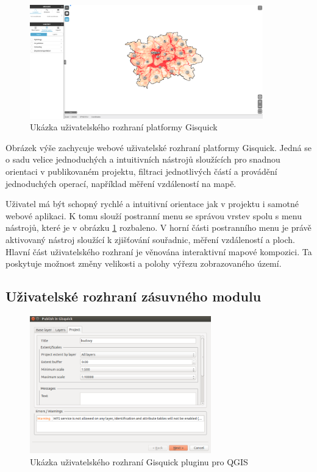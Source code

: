 \begin{figure}[h!]
\centering
\includegraphics[width=0.9\textwidth]{../img/gisquick_ui.png}
\caption{Ukázka uživatelského rozhraní platformy
Gisquick\cite{gisquick-prague}}
\label{fig:gisquick-prague}
\end{figure}

Obrázek výše zachycuje webové uživatelské rozhraní platformy
Gisquick. Jedná se o sadu velice jednoduchých a intuitivních nástrojů
sloužících pro snadnou orientaci v publikovaném projektu, filtraci
jednotlivých částí a provádění jednoduchých operací, například
měření vzdáleností na mapě.

Uživatel má být schopný rychlé a intuitivní orientace jak v projektu i 
samotné webové aplikaci. K tomu slouží postranní menu se správou
vrstev spolu s menu nástrojů, které je v obrázku \ref{fig:gisquick-prague}
rozbaleno. V horní části postranního menu je právě aktivovaný
nástroj sloužící k zjišťování souřadnic, měření vzdáleností
a ploch. Hlavní část uživatelského rozhraní je věnována interaktivní mapové kompozici. Ta
poskytuje možnost změny velikosti a polohy výřezu zobrazovaného území.

\newpage
\subsection{Uživatelské rozhraní zásuvného modulu}

\begin{figure}[h!]
	\centering
	\includegraphics[width=0.7\textwidth]{../img/gisquick_plugin.png}
	\caption{Ukázka uživatelského rozhraní Gisquick pluginu pro QGIS}
	\label{fig:gisquick-plugin}
\end{figure}

